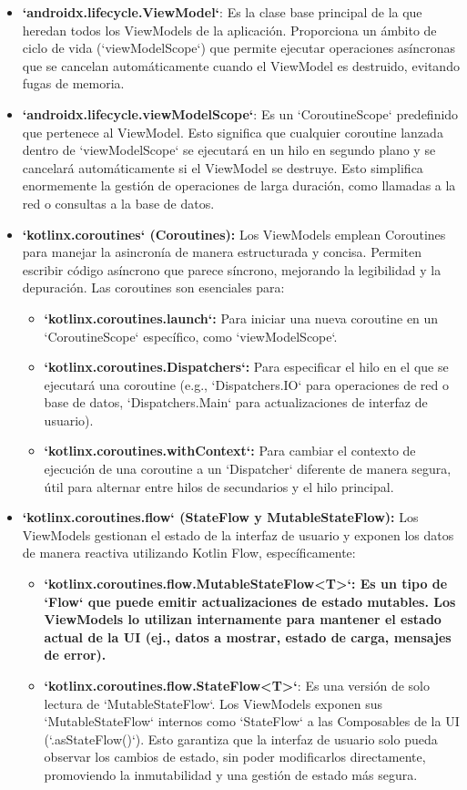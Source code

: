 \begin{itemize}
	\item \textbf{`androidx.lifecycle.ViewModel`}: Es la clase base principal de la que heredan todos los ViewModels de la aplicación. Proporciona un ámbito de ciclo de vida (`viewModelScope`) que permite ejecutar operaciones asíncronas que se cancelan automáticamente cuando el ViewModel es destruido, evitando fugas de memoria.
	
	\item \textbf{`androidx.lifecycle.viewModelScope`}: Es un `CoroutineScope` predefinido que pertenece al ViewModel. Esto significa que cualquier coroutine lanzada dentro de `viewModelScope` se ejecutará en un hilo en segundo plano y se cancelará automáticamente si el ViewModel se destruye. Esto simplifica enormemente la gestión de operaciones de larga duración, como llamadas a la red o consultas a la base de datos.
	
	\item \textbf{`kotlinx.coroutines` (Coroutines):}
	Los ViewModels emplean Coroutines para manejar la asincronía de manera estructurada y concisa. Permiten escribir código asíncrono que parece síncrono, mejorando la legibilidad y la depuración. Las coroutines son esenciales para:
	\begin{itemize}
		\item \textbf{`kotlinx.coroutines.launch`:} Para iniciar una nueva coroutine en un `CoroutineScope` específico, como `viewModelScope`.
		\item \textbf{`kotlinx.coroutines.Dispatchers`:} Para especificar el hilo en el que se ejecutará una coroutine (e.g., `Dispatchers.IO` para operaciones de red o base de datos, `Dispatchers.Main` para actualizaciones de interfaz de usuario).
		\item \textbf{`kotlinx.coroutines.withContext`:} Para cambiar el contexto de ejecución de una coroutine a un `Dispatcher` diferente de manera segura, útil para alternar entre hilos de secundarios y el hilo principal.
	\end{itemize}
	
	\item \textbf{`kotlinx.coroutines.flow` (StateFlow y MutableStateFlow):}
	Los ViewModels gestionan el estado de la interfaz de usuario y exponen los datos de manera reactiva utilizando Kotlin Flow, específicamente:
	\begin{itemize}
		\item \textbf{`kotlinx.coroutines.flow.MutableStateFlow<T>`: Es un tipo de `Flow` que puede emitir actualizaciones de estado mutables. Los ViewModels lo utilizan internamente para mantener el estado actual de la UI (ej., datos a mostrar, estado de carga, mensajes de error).}
		\item \textbf{`kotlinx.coroutines.flow.StateFlow<T>`}: Es una versión de solo lectura de `MutableStateFlow`. Los ViewModels exponen sus `MutableStateFlow` internos como `StateFlow` a las Composables de la UI (`.asStateFlow()`). Esto garantiza que la interfaz de usuario solo pueda observar los cambios de estado, sin poder modificarlos directamente, promoviendo la inmutabilidad y una gestión de estado más segura.
	\end{itemize}
	

\end{itemize}
